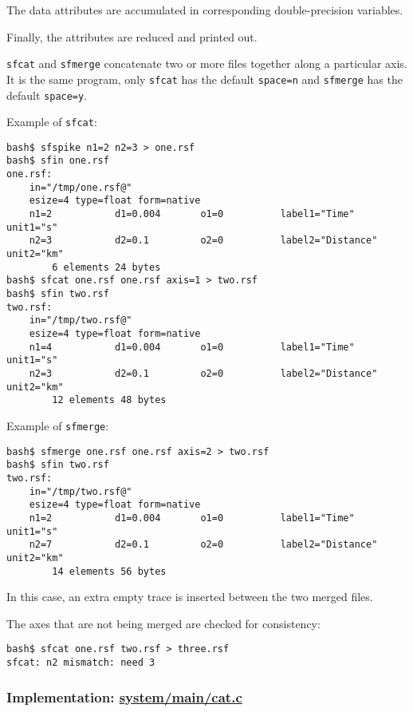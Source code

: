 The data attributes are accumulated in corresponding double-precision
variables. 

Finally, the attributes are reduced and printed out.

\noindent\doublebox{\parbox{\textwidth}{

}}

\texttt{sfcat} and \texttt{sfmerge} concatenate two or more files
together along a particular axis. It is the same program, only
\texttt{sfcat} has the default \texttt{space=n} and \texttt{sfmerge}
has the default \texttt{space=y}.

Example of \texttt{sfcat}:
\begin{verbatim}
bash$ sfspike n1=2 n2=3 > one.rsf
bash$ sfin one.rsf
one.rsf:
    in="/tmp/one.rsf@"
    esize=4 type=float form=native
    n1=2           d1=0.004       o1=0          label1="Time" unit1="s"
    n2=3           d2=0.1         o2=0          label2="Distance" unit2="km"
        6 elements 24 bytes
bash$ sfcat one.rsf one.rsf axis=1 > two.rsf
bash$ sfin two.rsf
two.rsf:
    in="/tmp/two.rsf@"
    esize=4 type=float form=native
    n1=4           d1=0.004       o1=0          label1="Time" unit1="s"
    n2=3           d2=0.1         o2=0          label2="Distance" unit2="km"
        12 elements 48 bytes
\end{verbatim}

Example of \texttt{sfmerge}:
\begin{verbatim}
bash$ sfmerge one.rsf one.rsf axis=2 > two.rsf
bash$ sfin two.rsf
two.rsf:
    in="/tmp/two.rsf@"
    esize=4 type=float form=native
    n1=2           d1=0.004       o1=0          label1="Time" unit1="s"
    n2=7           d2=0.1         o2=0          label2="Distance" unit2="km"
        14 elements 56 bytes
\end{verbatim}
In this case, an extra empty trace is inserted between the two merged files.

The axes that are not being merged are checked for consistency:
\begin{verbatim}
bash$ sfcat one.rsf two.rsf > three.rsf
sfcat: n2 mismatch: need 3
\end{verbatim}

\subsubsection{Implementation: \href{http://rsf.svn.sourceforge.net/viewvc/rsf/trunk/system/main/cat.c?view=markup}{system/main/cat.c}}


